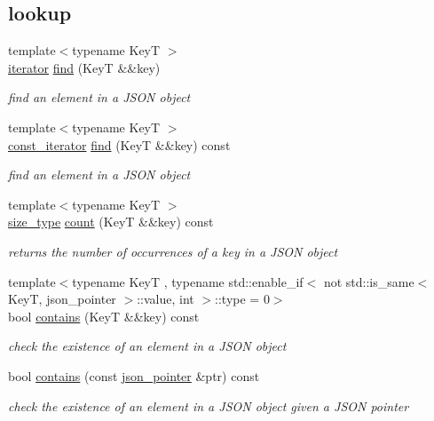 \subsection*{lookup}
\begin{DoxyCompactItemize}
\item 
{\footnotesize template$<$typename KeyT $>$ }\\\hyperlink{classnlohmann_1_1basic__json_a099316232c76c034030a38faa6e34dca}{iterator} \hyperlink{classnlohmann_1_1basic__json_a89eb3928f57903677051c80534be9cb1}{find} (KeyT \&\&key)
\begin{DoxyCompactList}\small\item\em find an element in a J\+S\+ON object \end{DoxyCompactList}\item 
{\footnotesize template$<$typename KeyT $>$ }\\\hyperlink{classnlohmann_1_1basic__json_a41a70cf9993951836d129bb1c2b3126a}{const\+\_\+iterator} \hyperlink{classnlohmann_1_1basic__json_a7f09e439835866afb2dfc467113945f5}{find} (KeyT \&\&key) const 
\begin{DoxyCompactList}\small\item\em find an element in a J\+S\+ON object \end{DoxyCompactList}\item 
{\footnotesize template$<$typename KeyT $>$ }\\\hyperlink{classnlohmann_1_1basic__json_a39f2cd0b58106097e0e67bf185cc519b}{size\+\_\+type} \hyperlink{classnlohmann_1_1basic__json_a3764a267fd627dcf56cbdb2bf91ce545}{count} (KeyT \&\&key) const 
\begin{DoxyCompactList}\small\item\em returns the number of occurrences of a key in a J\+S\+ON object \end{DoxyCompactList}\item 
{\footnotesize template$<$typename KeyT , typename std\+::enable\+\_\+if$<$ not std\+::is\+\_\+same$<$ Key\+T, json\+\_\+pointer $>$\+::value, int $>$\+::type  = 0$>$ }\\bool \hyperlink{classnlohmann_1_1basic__json_aab486f88c1224178ce11503043cf508f}{contains} (KeyT \&\&key) const 
\begin{DoxyCompactList}\small\item\em check the existence of an element in a J\+S\+ON object \end{DoxyCompactList}\item 
bool \hyperlink{classnlohmann_1_1basic__json_a4d85a6b7a7c6b0e1b13586a877385d3d}{contains} (const \hyperlink{classnlohmann_1_1basic__json_a6886a5001f5b449ad316101a311ce536}{json\+\_\+pointer} \&ptr) const 
\begin{DoxyCompactList}\small\item\em check the existence of an element in a J\+S\+ON object given a J\+S\+ON pointer \end{DoxyCompactList}\end{DoxyCompactItemize}
